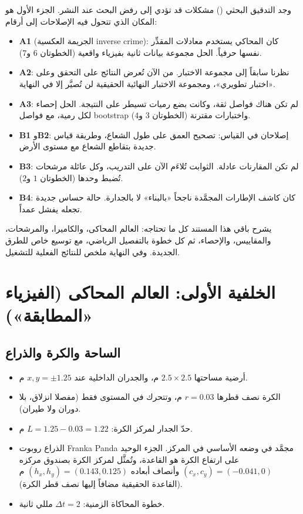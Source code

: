 \documentclass[11pt,a4paper]{article}
\newcommand{\en}[1]{\textenglish{#1}}
\newcommand{\code}[1]{\LR{\texttt{#1}}}
\begin{document}
\begin{why}
وجد التدقيق البحثي (\code{docs/research\_audit\_2026-11-01.md}) مشكلات قد تؤدي إلى رفض البحث عند النشر. الجزء الأول هو المكان
الذي تتحول فيه الإصلاحات إلى أرقام:
\begin{itemize}
\item \textbf{\en{A1}} (الجريمة العكسية \en{inverse crime}): كان المحاكي يستخدم معادلات المقدِّر نفسها حرفياً. الحل مجموعة بيانات ثانية
بفيزياء واقعية (الخطوتان $6$ و$7$).
\item \textbf{\en{A2}}: نظرنا سابقاً إلى مجموعة الاختبار. من الآن تُعرض النتائج على التحقق وعلى «اختبار تطويري»، ومجموعة
الاختبار النهائية الحقيقية لن تُصيَّر إلا في النهاية.
\item \textbf{\en{A3}}: لم تكن هناك فواصل ثقة، وكانت بضع رميات تسيطر على النتيجة. الحل إحصاء لكل رمية، مع فواصل
\en{bootstrap} واختبارات مقترنة (الخطوتان $3$ و$4$).
\item \textbf{\en{B1}} و\textbf{\en{B2}}: إصلاحان في القياس: تصحيح العمق على طول الشعاع، وطريقة قياس جديدة بتقاطع الشعاع مع
مستوى الأرض.
\item \textbf{\en{B3}}: لم تكن المقارنات عادلة. الثوابت تُلاءَم الآن على التدريب، وكل عائلة مرشحات تُضبط وحدها (الخطوتان $1$ و$2$).
\item \textbf{\en{B4}}: كان كاشف الإطارات المجمَّدة ناجحاً «بالبناء» لا بالجدارة. حالة حساس جديدة تجعله يفشل عمداً.
\end{itemize}
\end{why}

يشرح باقي هذا المستند كل ما تحتاجه: العالم المحاكى، والكاميرا، والمرشحات، والمقاييس، والإحصاء، ثم كل خطوة بالتفصيل
الرياضي، مع توسيع خاص للطرق الجديدة. وفي النهاية ملخص للنتائج الفعلية للتشغيل.

\section{الخلفية الأولى: العالم المحاكى (الفيزياء «المطابقة»)}

\subsection{الساحة والكرة والذراع}
\begin{itemize}
\item أرضية مساحتها $2.5\times2.5$ م، والجدران الداخلية عند $x,y=\pm1.25$ م.
\item الكرة نصف قطرها $r=0.03$ م، وتتحرك في المستوى فقط (مفصلا انزلاق، بلا دوران ولا طيران).
\item حدّ الجدار لمركز الكرة: $L=1.25-0.03=1.22$ م.
\item الذراع روبوت \en{Franka Panda} مجمَّد في وضعه الأساسي في المركز. الجزء الوحيد على ارتفاع الكرة هو القاعدة، وتُمثَّل
لمركز الكرة بصندوق مركزه $(c_x,c_y)=(-0.041,0)$ وأنصاف أبعاده $(h_x,h_y)=(0.143,0.125)$ م (القاعدة الحقيقية مضافاً إليها نصف قطر الكرة).
\item خطوة المحاكاة الزمنية: $\Delta t=2$ مللي ثانية.
\end{itemize}
\end{document}
